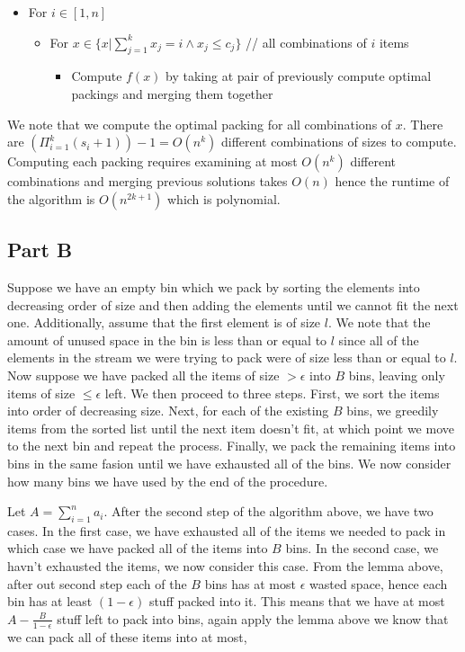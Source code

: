 \documentclass[a4paper]{article}
\begin{document}
\begin{itemize}
	\item For $i \in [1,n]$
	\begin{itemize}
		\item For $x \in \{x | \sum_{j=1}^k x_j = i \land x_j \leq c_j\}$ // all combinations of $i$ items
		\begin{itemize}
			\item Compute $f(x)$ by taking at pair of previously compute optimal packings and merging them together
		\end{itemize}
	\end{itemize}
\end{itemize}

We note that we compute the optimal packing for all combinations of $x$. There are $(\Pi_{i=1}^k (s_i + 1)) - 1 = O(n^k)$ different 
combinations of sizes to compute. Computing each packing requires examining at most $O(n^k)$ different combinations and merging 
previous solutions takes $O(n)$ hence the runtime of the algorithm is $O(n^{2k+1})$ which is polynomial.

\subsection{Part B}

Suppose we have an empty bin which we pack by sorting the elements into decreasing order of size and then 
adding the elements until we cannot fit the next one. Additionally, assume that the first element is of
size $l$. We note that the amount of unused space in the bin is less than or equal to $l$ since all of the elements in 
the stream we were trying to pack were of size less than or equal to $l$. Now suppose we have 
packed all the items of size $ > \epsilon$ into $B$ bins, leaving only items of size $ \leq \epsilon$ left. We then proceed to
three steps. First, we sort the items into order of decreasing size. Next,
for each of the existing $B$ bins, we greedily items from the sorted list until the next item doesn't fit,
at which point we move to the next bin and repeat the process. Finally, we pack the remaining items into 
bins in the same fasion until we have exhausted all of the bins. We now consider how many bins we have used by the end of the procedure.

Let $A = \sum_{i=1}^n a_i$.
After the second step of the algorithm above, we have two cases. In the first case, we have exhausted all 
of the items we needed to pack in which case we have packed all of the items into $B$ bins. In the 
second case, we havn't exhausted the items, we now consider this case.
From the lemma above, after out second step each of the $B$ bins has at most $\epsilon$ wasted space, 
hence each bin has at least $(1-\epsilon)$ stuff packed into it. This means that we have at most 
$A - \frac{B}{1-\epsilon}$ stuff left to pack into bins, again apply the lemma above we know that 
we can pack all of these items into at most,
\end{document}
